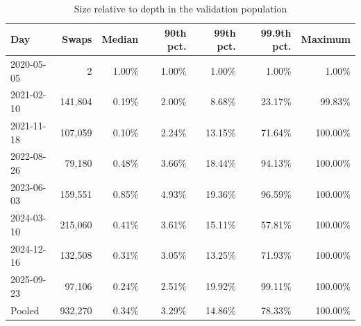 \begin{table}[t]
\centering
\caption{Size relative to depth in the validation population}
\label{tab:app:support}
\begin{tabular}{lrrrrrr}
\toprule
Day & Swaps & Median & 90th pct. & 99th pct. & 99.9th pct. & Maximum \\
\midrule
2020-05-05 & 2 & 1.00\% & 1.00\% & 1.00\% & 1.00\% & 1.00\% \\
2021-02-10 & 141{,}804 & 0.19\% & 2.00\% & 8.68\% & 23.17\% & 99.83\% \\
2021-11-18 & 107{,}059 & 0.10\% & 2.24\% & 13.15\% & 71.64\% & 100.00\% \\
2022-08-26 & 79{,}180 & 0.48\% & 3.66\% & 18.44\% & 94.13\% & 100.00\% \\
2023-06-03 & 159{,}551 & 0.85\% & 4.93\% & 19.36\% & 96.59\% & 100.00\% \\
2024-03-10 & 215{,}060 & 0.41\% & 3.61\% & 15.11\% & 57.81\% & 100.00\% \\
2024-12-16 & 132{,}508 & 0.31\% & 3.05\% & 13.25\% & 71.93\% & 100.00\% \\
2025-09-23 & 97{,}106 & 0.24\% & 2.51\% & 19.92\% & 99.11\% & 100.00\% \\
\midrule
Pooled & 932{,}270 & 0.34\% & 3.29\% & 14.86\% & 78.33\% & 100.00\% \\
\bottomrule
\end{tabular}
\end{table}

